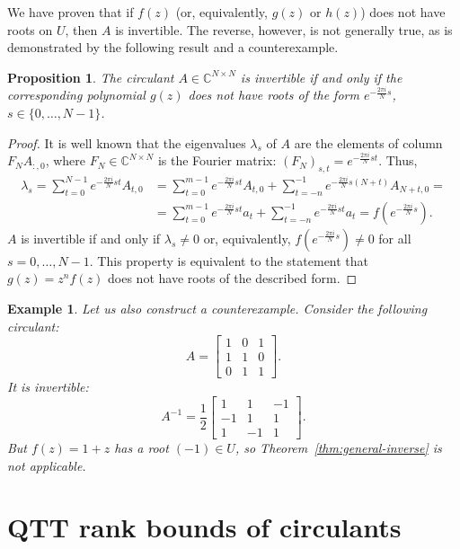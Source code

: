 \documentclass[a4paper]{article}
\newtheorem{proposition}{Proposition}[section]
\newtheorem{example}{Example}[section]
\begin{document}
	We have proven that if $f(z)$ (or, equivalently, $g(z)$ or $h(z)$) does not have roots on $U$, then $A$ is invertible.
	The reverse, however, is not generally true, as is demonstrated by the following result and a counterexample.
	
	\begin{proposition}
	    The circulant $A \in \mathbb{C}^{N\times N}$ is invertible if and only if the corresponding polynomial $g(z)$ does not have roots of the form $e^{-\frac{2 \pi i}{N}s}$, $s \in \{0, \dots, N-1\}$.
	\end{proposition}
	\begin{proof}
	    It is well known that the eigenvalues $\lambda_s$ of $A$ are the elements of column $F_N A_{:,0}$, where $F_N \in \mathbb{C}^{N\times N}$ is the Fourier matrix: $(F_N)_{s,t} = e^{-\frac{2 \pi i}{N}st}$.
	    Thus, 
	    \begin{align*}
	    \lambda_s = \sum_{t=0}^{N-1}e^{-\frac{2 \pi i}{N}st} A_{t,0}
	    &=
	    \sum_{t=0}^{m-1}e^{-\frac{2 \pi i}{N}st} A_{t,0}
	    +
	    \sum_{t=-n}^{-1}e^{-\frac{2 \pi i}{N}s(N+t)} A_{N+t,0}
	    = \\ &=
	    \sum_{t=0}^{m-1}e^{-\frac{2 \pi i}{N}st} a_t
	    +
	    \sum_{t=-n}^{-1}e^{-\frac{2 \pi i}{N}st} a_t
	    =
	    f(e^{-\frac{2 \pi i}{N}s}).
	    \end{align*}
	   $A$ is invertible if and only if $\lambda_s \neq 0$ or, equivalently, $f(e^{-\frac{2 \pi i}{N}s}) \neq 0$ for all $s = 0, \dots, N-1$.
	   This property is equivalent to the statement that $g(z) = z^nf(z)$ does not have roots of the described form.
	\end{proof}
	\begin{example}
	    Let us also construct a counterexample. Consider the following circulant:
	\[
	A = \begin{bmatrix}
	    1 & 0 & 1 \\
	    1 & 1 & 0 \\
	    0 & 1 & 1
	\end{bmatrix}.
	\]
	It is invertible:
	\[
	A^{-1} = \frac{1}{2}
	\begin{bmatrix}
	    1 & 1  & -1 \\
	    -1& 1  & 1 \\
	    1 & -1 & 1
	\end{bmatrix}.
	\]
	But $f(z) = 1 + z$ has a root $(-1) \in U$, so Theorem~\ref{thm:general-inverse} is not applicable.
	\end{example}


\section{QTT rank bounds of circulants}\label{sec:qtt_ranks}
\end{document}
